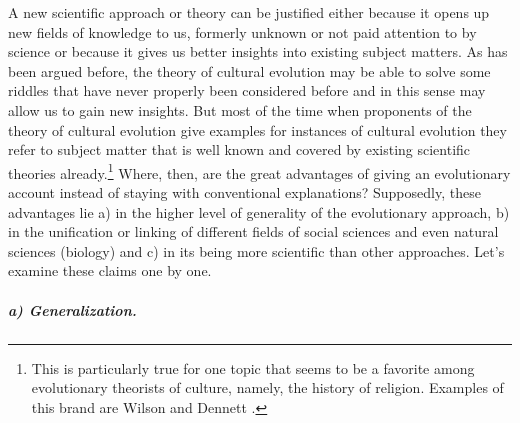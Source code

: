 A new scientific approach or theory can be justified either because it opens
up new fields of knowledge to us, formerly unknown or not paid attention to by
science or because it gives us better insights into existing subject matters.
As has been argued before, the theory of cultural evolution may be able to
solve some riddles that have never properly been considered before and in this
sense may allow us to gain new insights. But most of the time when proponents
of the theory of cultural evolution give examples for instances of cultural
evolution they refer to subject matter that is well known and covered by
existing scientific theories already.\footnote{This is particularly true for
one topic that seems to be a favorite among evolutionary theorists of culture,
namely, the history of religion. Examples of this brand are Wilson
\cite[]{wilson:2002} and Dennett \cite[]{dennett:2006}.} Where, then, are the
great advantages of giving an evolutionary account instead of staying with
conventional explanations? Supposedly, these advantages lie a) in the higher
level of generality of the evolutionary approach, b) in the unification or
linking of different fields of social sciences and even natural sciences
(biology) and c) in its being more scientific than other approaches. Let's
examine these claims one by one.

\subparagraph{a) Generalization.}

